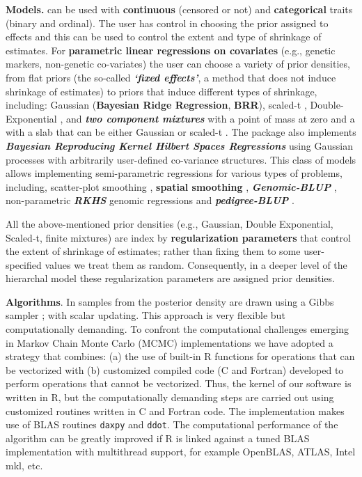 \documentclass[article,shortnames,nojss]{jss}
\begin{document}
\textbf{Models.}  can be used with \textbf{continuous} (censored or not) 
and \textbf{categorical} traits (binary and ordinal). The user has 
control in choosing the prior assigned to effects and this can be used to control the extent 
and type of shrinkage of estimates. For \textbf{parametric linear regressions on covariates} 
(e.g., genetic markers, non-genetic co-variates) the 
user can choose a variety of prior densities, from flat 
priors (the so-called \textbf{\emph{`fixed effects'}}, a method that 
does not induce shrinkage of estimates) to priors that induce 
different types of shrinkage, including: 
Gaussian (\textbf{Bayesian Ridge Regression}, \textbf{BRR}), 
scaled-t \citep[\textbf{BayesA}][]{Meuwissen:2001}, 
Double-Exponential \citep[\textbf{Bayesian LASSO}, \textbf{BL}][]{Park:2008}, and 
\textbf{\emph{two component mixtures}} with a point of mass at zero and a with a slab 
that can be either Gaussian \citep[\textbf{BayesC},][]{Habier:2011} or scaled-t 
\citep[\textbf{BayesB},][]{Habier:2011}. 
The  package also implements \textbf{\emph{Bayesian Reproducing Kernel Hilbert Spaces Regressions}} 
\citep[\textbf{RKHS,}][]{Wahba:1990} using Gaussian processes with arbitrarily 
user-defined co-variance structures. This class of models allows 
implementing semi-parametric regressions for various types of 
problems, including, scatter-plot smoothing
\citep[e.g., \textbf{\emph{smoothing splines}}][]{Wahba:1990}, 
\textbf{spatial smoothing} \citep{Cressie:1988}, 
\textbf{\emph{Genomic-BLUP}} \citep{VanRaden:2008}, 
non-parametric \textbf{\emph{RKHS}} genomic regressions 
\citep{Gianola:2006, Gianola:2008,delosCampos:2010b} and \textbf{\emph{pedigree-BLUP}} 
\citep{Henderson:1975}.

All the above-mentioned prior densities (e.g., Gaussian, Double Exponential, Scaled-t, finite mixtures) 
are index by  \textbf{regularization parameters} that control the extent of shrinkage 
of estimates; rather than fixing them to some user-specified 
values we treat them as random. Consequently, in a deeper level of the 
hierarchal model these regularization parameters are assigned 
prior densities.

\textbf{Algorithms}. In  samples from the posterior 
density are drawn using a Gibbs sampler \citep{Geman:1984, Casella:1992}; with 
scalar updating.  This approach is 
very flexible but computationally demanding. To confront 
the computational challenges emerging in Markov Chain 
Monte Carlo (MCMC) implementations we have adopted a strategy that combines: 
(a) the use of built-in R functions for operations that can be vectorized with 
(b) customized compiled code (C and Fortran) developed to perform operations that cannot be vectorized. Thus, 
the kernel of our software is written in R, but the computationally 
demanding steps are carried out using customized routines written in C and 
Fortran code. The implementation makes use of BLAS routines \texttt{daxpy} and \texttt{ddot}. 
The computational performance of the algorithm can be 
greatly improved if R is linked against a tuned BLAS 
implementation with multithread support, for example 
OpenBLAS, ATLAS, Intel mkl, etc. 
\end{document}
